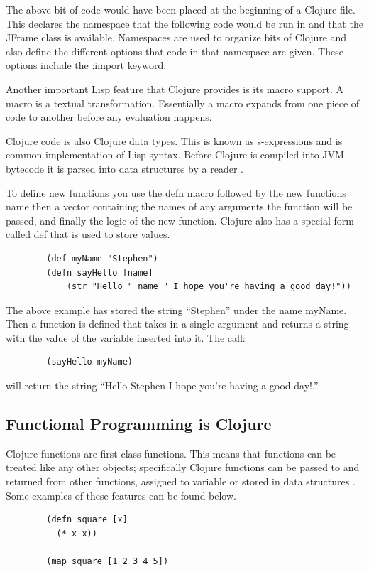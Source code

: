 \documentclass[12pt]{article}
\begin{document}
	The above bit of code would have been placed at the beginning of a Clojure file. This declares the namespace that the following code would be run in and that the JFrame class is available. Namespaces are used to organize bits of Clojure and also define the different options that code in that namespace are given. These options include the :import keyword.
	
	Another important Lisp feature that Clojure provides is its macro support. A macro is a textual transformation. Essentially a macro expands from one piece of code to another before any evaluation happens.
	
	Clojure code is also Clojure data types. This is known as s-expressions and is common implementation of Lisp syntax. Before Clojure is compiled into JVM bytecode it is parsed into data structures by a reader \cite{wiki}. 
	
	To define new functions you use the defn macro followed by the new functions name then a vector containing the names of any arguments the function will be passed, and finally the logic of the new function. Clojure also has a special form called def that is used to store values.
	
	\begin{verbatim}
		(def myName "Stephen")
		(defn sayHello [name]
			(str "Hello " name " I hope you're having a good day!"))
	\end{verbatim}
		The above example has stored the string ``Stephen'' under the name myName. Then a function is defined that takes in a single argument and returns a string with the value of the variable inserted into it. The call:
	\begin{verbatim}
		(sayHello myName)
	\end{verbatim}
	will return the string ``Hello Stephen I hope you're having a good day!.''
	
	\subsection{Functional Programming is Clojure}
	
	Clojure functions are first class functions. This means that functions can be treated like any other objects; specifically Clojure functions can be passed to and returned from other functions, assigned to variable or stored in data structures \cite{wiki:first-class}. Some examples of these features can be found below. 
	\begin{verbatim}
		(defn square [x] 
		  (* x x))
		
		(map square [1 2 3 4 5])
	\end{verbatim}
	
\end{document}
